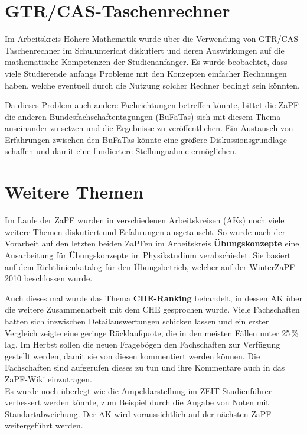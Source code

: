 \documentclass{scrartcl}
\begin{document}
\section*{GTR/CAS-Taschenrechner}
Im Arbeitskreis Höhere Mathematik wurde über die Verwendung von GTR/CAS-Taschen\-rechner im Schuluntericht diskutiert
und deren Auswirkungen auf die mathematische Kompetenzen der Studienanfänger. Es wurde beobachtet, dass viele
Studierende anfangs Probleme mit den Konzepten einfacher Rechnungen haben, welche eventuell durch die
Nutzung solcher Rechner bedingt sein könnten. 

Da dieses Problem auch andere Fachrichtungen betreffen könnte, bittet die ZaPF die anderen Bundesfachschaftentagungen
(BuFaTas) sich mit diesem Thema auseinander zu setzen und die Ergebnisse zu veröffentlichen. Ein Austausch von
Erfahrungen zwischen den BuFaTas könnte eine größere Diskussionsgrundlage schaffen und damit eine fundiertere
Stellungnahme ermöglichen.


\section*{Weitere Themen}
Im Laufe der ZaPF wurden in verschiedenen Arbeitskreisen (AKs) noch viele weitere Themen diskutiert und Erfahrungen
ausgetauscht. So wurde nach der Vorarbeit auf den letzten beiden ZaPFen im Arbeitskreis \textbf{Übungskonzepte}
eine \href{http://www.zapfev.de/resolutionen/sose11/Reso_Uebungskonzepte.pdf}{Ausarbeitung} für
Übungskonzepte im Physikstudium verabschiedet.
Sie basiert auf dem Richtlinienkatalog für den Übungsbetrieb, welcher auf der WinterZaPF 2010 beschlossen wurde.

Auch dieses mal wurde das Thema \textbf{CHE-Ranking} behandelt, in dessen AK über die weitere Zusammenarbeit mit dem CHE
gesprochen wurde. Viele Fachschaften hatten sich inzwischen Detailauswertungen schicken lassen und ein erster Vergleich
zeigte
eine geringe Rücklaufquote, die in den meisten Fällen unter 25\,\% lag. Im Herbst sollen die neuen Fragebögen den
Fachschaften zur Verfügung gestellt werden, damit sie von diesen kommentiert werden können. Die Fachschaften sind
aufgerufen dieses zu tun und ihre Kommentare auch in das ZaPF-Wiki einzutragen.\\
Es wurde noch überlegt wie die Ampeldarstellung im ZEIT-Studienführer verbessert werden könnte, zum Beispiel durch die
Angabe von Noten mit Standartabweichung. Der AK wird voraussichtlich auf der nächsten ZaPF weitergeführt werden.
\end{document}
